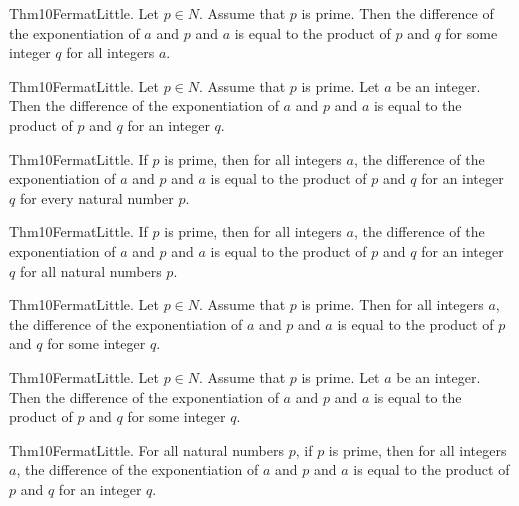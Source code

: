 \documentclass{article}
\begin{document}
Thm10FermatLittle. Let $p \in N$. Assume that $p$ is prime. Then the difference of the exponentiation of $a$ and $p$ and $a$ is equal to the product of $p$ and $q$ for some integer $q$ for all integers $a$.

Thm10FermatLittle. Let $p \in N$. Assume that $p$ is prime. Let $a$ be an integer. Then the difference of the exponentiation of $a$ and $p$ and $a$ is equal to the product of $p$ and $q$ for an integer $q$.

Thm10FermatLittle. If $p$ is prime, then for all integers $a$, the difference of the exponentiation of $a$ and $p$ and $a$ is equal to the product of $p$ and $q$ for an integer $q$ for every natural number $p$.

Thm10FermatLittle. If $p$ is prime, then for all integers $a$, the difference of the exponentiation of $a$ and $p$ and $a$ is equal to the product of $p$ and $q$ for an integer $q$ for all natural numbers $p$.

Thm10FermatLittle. Let $p \in N$. Assume that $p$ is prime. Then for all integers $a$, the difference of the exponentiation of $a$ and $p$ and $a$ is equal to the product of $p$ and $q$ for some integer $q$.

Thm10FermatLittle. Let $p \in N$. Assume that $p$ is prime. Let $a$ be an integer. Then the difference of the exponentiation of $a$ and $p$ and $a$ is equal to the product of $p$ and $q$ for some integer $q$.

Thm10FermatLittle. For all natural numbers $p$, if $p$ is prime, then for all integers $a$, the difference of the exponentiation of $a$ and $p$ and $a$ is equal to the product of $p$ and $q$ for an integer $q$.
\end{document}
